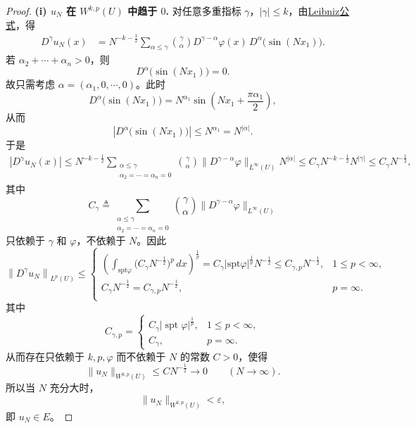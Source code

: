 \documentclass[../../main.tex]{subfiles}
\begin{document}
\begin{proof}
\noindent\textbf{(i) \(u_N\) 在 \(W^{k,p}(U)\) 中趋于 \(0\).}
对任意多重指标 \(\gamma\)，\(|\gamma|\leqslant k\)，由\hyperref[theorem:ch05-弱导数性质-4]{Leibniz公式}，得
\begin{align*}
D^\gamma u_N(x)
&=N^{-k-\frac12}\sum_{\alpha\leqslant\gamma}
\binom{\gamma}{\alpha}
D^{\gamma-\alpha}\varphi(x)\,
D^\alpha\bigl(\sin(Nx_1)\bigr).
\end{align*}
若 \(\alpha_2+\cdots+\alpha_n>0\)，则
\[
D^\alpha\bigl(\sin(Nx_1)\bigr)=0.
\]
故只需考虑 \(\alpha=(\alpha_1,0,\cdots,0)\)。此时
\[
D^\alpha\bigl(\sin(Nx_1)\bigr)
=N^{\alpha_1}\sin\left(Nx_1+\frac{\pi\alpha_1}{2}\right),
\]
从而
\[
\left|D^\alpha\bigl(\sin(Nx_1)\bigr)\right|
\leqslant N^{\alpha_1}=N^{|\alpha|}.
\]
于是
\begin{align*}
|D^\gamma u_N(x)|
\leqslant N^{-k-\frac12}
\sum_{\substack{\alpha\leqslant\gamma\\
\alpha_2=\cdots=\alpha_n=0}}
\binom{\gamma}{\alpha}
\|D^{\gamma-\alpha}\varphi\|_{L^\infty(U)}
N^{|\alpha|}\leqslant C_\gamma N^{-k-\frac12}N^{|\gamma|}
\leqslant C_\gamma N^{-\frac12},
\end{align*}
其中
\[
C_\gamma\triangleq
\sum_{\substack{\alpha\leqslant\gamma\\
\alpha_2=\cdots=\alpha_n=0}}
\binom{\gamma}{\alpha}
\|D^{\gamma-\alpha}\varphi\|_{L^\infty(U)}
\]
只依赖于 \(\gamma\) 和 \(\varphi\)，不依赖于 \(N\)。因此
\[
\left\| D^{\gamma}u_N \right\| _{L^p(U)}\leqslant \begin{cases}
\left( \int_{\mathrm{spt}\varphi}{\bigl( C_{\gamma}N^{-\frac{1}{2}} \bigr) ^p\,dx} \right) ^{\frac{1}{p}}=C_{\gamma}|\mathrm{spt}\varphi |^{\frac{1}{p}}N^{-\frac{1}{2}}\leqslant C_{\gamma ,p}N^{-\frac{1}{2}},&1\leqslant p<\infty ,\\
C_{\gamma}N^{-\frac{1}{2}}= C_{\gamma ,p}N^{-\frac{1}{2}},&p=\infty .\\
\end{cases}
\]
其中
\[
C_{\gamma,p}=
\begin{cases}
C_\gamma|\operatorname{spt}\varphi|^{\frac{1}{p}},&1\leqslant p<\infty,\\[2mm]
C_\gamma,&p=\infty.
\end{cases}
\]
从而存在只依赖于 \(k,p,\varphi\) 而不依赖于 \(N\) 的常数 \(C>0\)，使得
\[
\|u_N\|_{W^{k,p}(U)}
\leqslant C N^{-\frac12}\longrightarrow0
\qquad(N\to\infty).
\]
所以当 \(N\) 充分大时，
\[
\|u_N\|_{W^{k,p}(U)}<\varepsilon,
\]
即 \(u_N\in E\)。


\end{proof}
\end{document}
